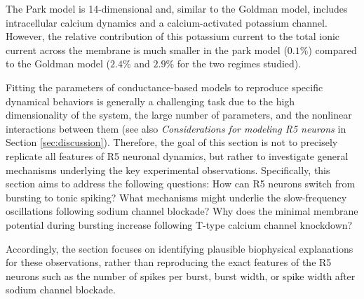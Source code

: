 \documentclass[../main.tex]{subfiles}
\begin{document}
The Park model is 14-dimensional and, similar to the Goldman model, includes intracellular calcium dynamics and a calcium-activated potassium channel. However, the relative contribution of this potassium current to the total ionic current across the membrane is much smaller in the park model ($0.1\%$) compared to the Goldman model ($2.4\%$ and $2.9\%$ for the two regimes studied).

Fitting the parameters of conductance-based models to reproduce specific dynamical behaviors is generally a challenging task due to the high dimensionality of the system, the large number of parameters, and the nonlinear interactions between them \cite{alonsoVisualizationCurrentsNeural2019} (see also \textit{Considerations for modeling R5 neurons} in Section \ref{sec:discussion}). Therefore, the goal of this section is not to precisely replicate all features of R5 neuronal dynamics, but rather to investigate general mechanisms underlying the key experimental observations.
Specifically, this section aims to address the following questions: How can R5 neurons switch from bursting to tonic spiking? What mechanisms might underlie the slow-frequency oscillations following sodium channel blockade? Why does the minimal membrane potential during bursting increase following T-type calcium channel knockdown?

Accordingly, the section focuses on identifying plausible biophysical explanations for these observations, rather than reproducing the exact features of the R5 neurons such as the number of spikes per burst, burst width, or spike width after sodium channel blockade.
\end{document}
